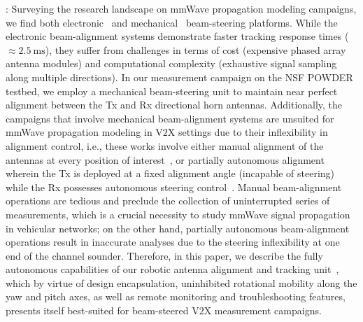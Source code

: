 \documentclass[10pt, twocolumn]{IEEEtran}
\begin{document}
: Surveying the research landscape on mmWave propagation modeling campaigns, we find both electronic~\cite{AgileLink, Outdoor28G, DigitalDivide} and mechanical~\cite{Purdue, Foliage, Harvard, SpatialConsistencyOriginal, SpatialDynamics, SuburbanGeometryJournal, FoliageSimulations, QDC_NIST, D2DHumanBlockage, V2XBlockages, MacCartneyUrbanHumanBlockage} beam-steering platforms. While the electronic beam-alignment systems demonstrate faster tracking response times (${\approx}\SI{2.5}{\milli\second}$), they suffer from challenges in terms of cost (expensive phased array antenna modules) and computational complexity (exhaustive signal sampling along multiple directions). In our measurement campaign on the NSF POWDER testbed, we employ a mechanical beam-steering unit to maintain near perfect alignment between the Tx and Rx directional horn antennas. Additionally, the campaigns that involve mechanical beam-alignment systems are unsuited for mmWave propagation modeling in V$2$X settings due to their inflexibility in alignment control, i.e., these works involve either manual alignment of the antennas at every position of interest~\cite{Purdue, Harvard, SpatialConsistencyOriginal, SpatialDynamics, SuburbanGeometryJournal, QDC_NIST, D2DHumanBlockage, MacCartneyUrbanHumanBlockage}, or partially autonomous alignment wherein the Tx is deployed at a fixed alignment angle (incapable of steering) while the Rx possesses autonomous steering control~\cite{Foliage, FoliageSimulations, PDAPs, V2XBlockages}. Manual beam-alignment operations are tedious and preclude the collection of uninterrupted series of measurements, which is a crucial necessity to study mmWave signal propagation in vehicular networks; on the other hand, partially autonomous beam-alignment operations result in inaccurate analyses due to the steering inflexibility at one end of the channel sounder. Therefore, in this paper, we describe the fully autonomous capabilities of our robotic antenna alignment and tracking unit~\cite{SPAVE_ICC}, which by virtue of design encapsulation, uninhibited rotational mobility along the yaw and pitch axes, as well as remote monitoring and troubleshooting features, presents itself best-suited for beam-steered V$2$X measurement campaigns.\\
\end{document}
